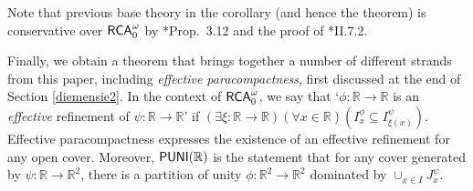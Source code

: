 \documentclass[reqno]{amsart}
\newtheorem{thm}{Theorem}
\def\RCA{\textup{\textsf{RCA}}}
\def\RCAo{\textup{\textsf{RCA}}_{0}^{\omega}}
\def\WKL{\textup{\textsf{WKL}}}
\def\R{{\mathbb  R}}
\def\di{\rightarrow}
\def\asa{\leftrightarrow}
\def\PUNI{\textup{\textsf{PUNI}}}
\def\QFAC{\textup{\textsf{QF-AC}}}
\def\HBU{\textup{\textsf{HBU}}}
\def\HBT{\textup{\textsf{HBT}}}
\numberwithin{equation}{section}
\numberwithin{thm}{section}
\begin{document}
Note that previous base theory in the corollary (and hence the theorem) is conservative over $\RCAo$ by \cite{kohlenbach2}*{Prop.\ 3.12} and the proof of \cite{simpson2}*{II.7.2}.
%
%

\smallskip

Finally, we obtain a theorem that brings together a number of different strands from this paper, including \emph{effective paracompactness}, first discussed at the end of Section \ref{diemensie2}.  
In the context of $\RCAo$, we say that `$\phi:\R\di \R$ is an \emph{effective} refinement of $\psi:\R\di \R$' if $(\exists \xi:\R\di\R)(\forall x\in \R)(I_{x}^{\phi}\subseteq I_{\xi(x)}^{\psi})$.  %
Effective paracompactness expresses the existence of an effective refinement for any open cover.  Moreover, $\PUNI(\R)$ is the statement that for any cover generated by $\psi:\R\di \R^{2}$,  there is a partition of unity $\phi:\R^{2}\di \R^{2}$ dominated by $\cup_{x\in I}J_{x}^{\psi}$.
 
\end{document}
